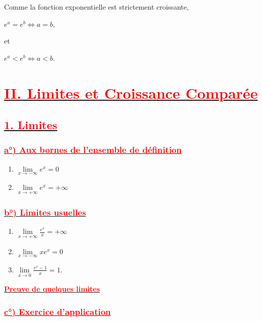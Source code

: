 \documentclass[12pt,a4paper]{article}
\begin{document}
Comme la fonction exponentielle est strictement croissante,

\(
e^a=e^b
\Longleftrightarrow
a=b,
\)

et

\(
e^a<e^b
\Longleftrightarrow
a<b.
\)

\section*{\underline{\textbf{\textcolor{red}{II. Limites et Croissance Comparée}}}}
\subsection*{\underline{\textbf{\textcolor{red}{1. Limites}}}}

\subsubsection*{\underline{\textbf{\textcolor{red}{a°) Aux bornes de l'ensemble de définition}}}}

\begin{enumerate}
\item \(
\lim\limits_{x\to-\infty}e^x=0
\)

\item \(
\lim\limits_{x\to+\infty}e^x=+\infty
\)
\end{enumerate}

\subsubsection*{\underline{\textbf{\textcolor{red}{b°) Limites usuelles}}}}
\begin{enumerate}
\item \(
\lim\limits_{x\to+\infty}\frac{e^x}{x}=+\infty
\)

\item \(
\lim\limits_{x\to-\infty}xe^x=0
\)

\item \(
\lim\limits_{x\to0}\frac{e^x-1}{x}=1.
\)
\end{enumerate}
\underline{\textbf{\textcolor{red}{Preuve de quelques limites}}}\\

\subsubsection*{\underline{\textbf{\textcolor{red}{ c°) Exercice d'application  }}}}
\end{document}
